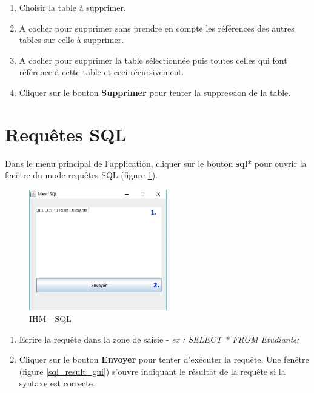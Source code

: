 \begin{enumerate}
\item Choisir la table à supprimer.
\item A cocher pour supprimer sans prendre en compte les références des autres tables sur celle à supprimer.
\item A cocher pour supprimer la table sélectionnée puis toutes celles qui font référence à cette table et ceci récursivement.
\item Cliquer sur le bouton \textbf{Supprimer} pour tenter la suppression de la table.
\end{enumerate}

\section{Requ\^etes SQL}
Dans le menu principal de l'application, cliquer sur le bouton \textbf{\gls{sql}}* pour ouvrir la fen\^etre du mode requ\^etes SQL (figure \ref{sql_gui}).
\begin{figure}[!h]
\centering
\includegraphics[width=6cm]{./images/manuel/sql.eps}
\caption{IHM - SQL}
\label{sql_gui}
\end{figure}

\begin{enumerate}
\item Ecrire la requ\^ete dans la zone de saisie - \textit{ex : SELECT * FROM Etudiants;} 
\item Cliquer sur le bouton \textbf{Envoyer} pour tenter d'exécuter la requ\^ete.
Une fenêtre (figure \ref{sql_result_gui}) s'ouvre indiquant le résultat de la requ\^ete si la syntaxe est correcte.
\end{enumerate}

